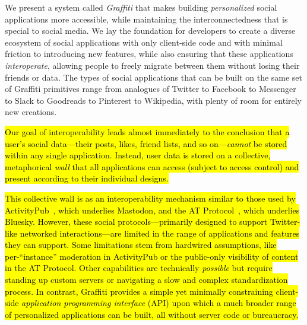 
We present a system called \emph{Graffiti} that makes
building \emph{personalized} social applications
more accessible,
while maintaining the interconnectedness that is special to social media.
We lay the foundation for developers to create a diverse ecosystem
of social applications
with only client-side code and with minimal friction
to introducing new features,
while also ensuring that these applications \emph{interoperate},
allowing people to freely migrate between them without
losing their friends or data.
The types of social applications that can be built on the same set of Graffiti primitives range from analogues of Twitter to Facebook to Messenger to Slack to Goodreads to Pinterest to Wikipedia,
with plenty of room for entirely new creations.


\hl{%
Our goal of interoperability leads almost immediately
to the conclusion that a user's
social data---their posts, likes, friend lists, and so on---\emph{cannot}
be stored within any single application.
Instead, user data is stored on a collective, metaphorical \emph{wall}
that all applications can access (subject to access control)
and present according to their individual designs.
}%

\hl{%
This collective wall is as an interoperability mechanism similar to
those used by
ActivityPub~{\cite{activitypub}},
which underlies Mastodon,
and the AT Protocol~{\cite{bluesky}}, which underlies Bluesky.
However, these social protocols---primarily designed to support
Twitter-like networked interactions---are limited in the range of applications
and features they can support.
Some limitations stem from hardwired assumptions,
like per-``instance'' moderation in ActivityPub
or the public-only visibility of content in the AT Protocol.
Other capabilities are technically \emph{possible}
but require standing up custom servers or navigating
a slow and complex standardization process.
In contrast, Graffiti provides a simple yet minimally constraining
client-side \emph{application programming interface} (API)
upon which a much broader range of personalized applications can be built, all
without server code or bureaucracy.
}%

